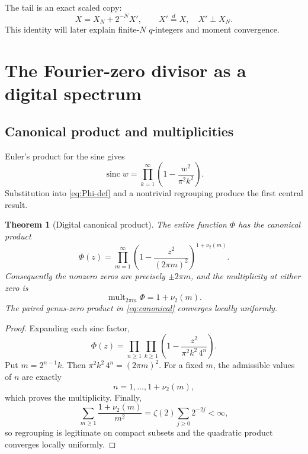 \documentclass[11pt,oneside]{article}
\newtheorem{theorem}{Theorem}[section]
\theoremstyle{definition}
\theoremstyle{remark}
\newcommand{\sinc}{\operatorname{sinc}}
\begin{document}
The tail is an exact scaled copy:
\begin{equation}
 X=X_N+2^{-N}X',
 \qquad X'\stackrel d=X,\quad X'\perp X_N.
 \label{eq:tail-copy}
\end{equation}
This identity will later explain finite-\(N\) \(q\)-integers and moment
convergence.

\section{The Fourier-zero divisor as a digital spectrum}

\subsection{Canonical product and multiplicities}

Euler's product for the sine gives
\[
 \sinc w=\prod_{k=1}^{\infty}\left(1-\frac{w^2}{\pi^2k^2}\right).
\]
Substitution into \eqref{eq:Phi-def} and a nontrivial regrouping produce the
first central result.

\begin{theorem}[Digital canonical product]
\label{thm:canonical}
The entire function \(\Phi\) has the canonical product
\begin{equation}
 \boxed{\displaystyle
 \Phi(z)=
 \prod_{m=1}^{\infty}
 \left(1-\frac{z^2}{(2\pi m)^2}\right)^{1+\nu_2(m)}.}
 \label{eq:canonical}
\end{equation}
Consequently the nonzero zeros are precisely \(\pm2\pi m\), and the
multiplicity at either zero is
\begin{equation}
 \operatorname{mult}_{2\pi m}\Phi=1+\nu_2(m).
 \label{eq:multiplicity}
\end{equation}
The paired genus-zero product in \eqref{eq:canonical} converges locally
uniformly.
\end{theorem}

\begin{proof}
Expanding each sinc factor,
\[
 \Phi(z)=
 \prod_{n\geq1}\prod_{k\geq1}
 \left(1-\frac{z^2}{\pi^2k^2\,4^n}\right).
\]
Put \(m=2^{n-1}k\).  Then
\(\pi^2k^2\,4^n=(2\pi m)^2\).  For a fixed \(m\), the admissible values of
\(n\) are exactly
\[
 n=1,\ldots,1+\nu_2(m),
\]
which proves the multiplicity.  Finally,
\[
 \sum_{m\geq1}\frac{1+\nu_2(m)}{m^2}
 =\zeta(2)\sum_{j\geq0}2^{-2j}<\infty,
\]
so regrouping is legitimate on compact subsets and the quadratic product
converges locally uniformly.
\end{proof}
\end{document}
